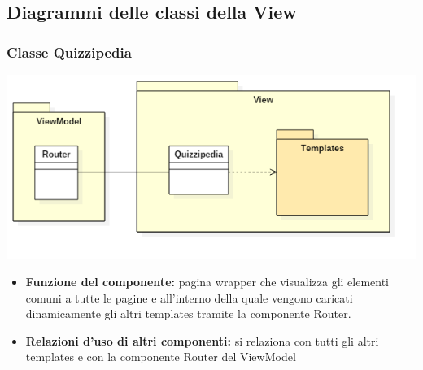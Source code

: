 \subsection{Diagrammi delle classi della View}	
	\subsubsection{Classe Quizzipedia}
	\begin{center}
			\includegraphics[scale=0.6]{../images/Quizzipedia.png}
		\end{center}
			\begin{itemize}
				\item\textbf{Funzione del componente:} pagina wrapper che visualizza gli elementi comuni a tutte le pagine e all'interno della quale vengono caricati dinamicamente gli altri templates tramite la componente Router.
				\item\textbf{Relazioni d'uso di altri componenti:} si relaziona con tutti gli altri templates e con la componente Router del ViewModel
			\end{itemize}	
	\newpage	
	
